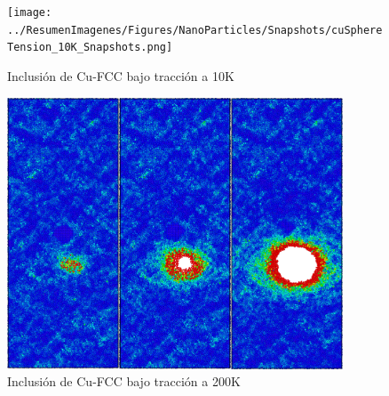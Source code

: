\begin{figure}[htp]
\centering
\texttt{[image: ../ResumenImagenes/Figures/NanoParticles/Snapshots/cuSphereTension\_10K\_Snapshots.png]}
\caption{Inclusión de Cu-FCC bajo tracción a 10K}
\label{C4:fg:snapshot_ten_FCC_10K}
\end{figure}

% 

\begin{figure}[htp]
\centering
\includegraphics[width=10cm]{../ResumenImagenes/Figures/NanoParticles/Snapshots/cuSphereTension_200K_Snapshots.png}
\caption{Inclusión de Cu-FCC bajo tracción a 200K}
\label{C4:fg:snapshot_ten_FCC_200K}
\end{figure}

